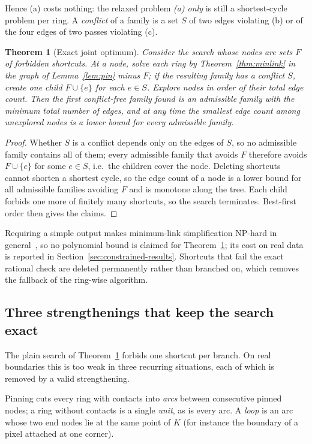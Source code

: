 \documentclass[11pt,a4paper]{article}
\newtheorem{theorem}{Theorem}
\theoremstyle{definition}
\theoremstyle{remark}
\begin{document}
Hence (a) costs nothing: the relaxed problem \emph{(a) only} is still a
shortest-cycle problem per ring. A \emph{conflict} of a family is a set $S$ of
two edges violating (b) or of the four edges of two passes violating (c).

\begin{theorem}[Exact joint optimum]\label{thm:bnb}
Consider the search whose nodes are sets $F$ of forbidden shortcuts. At a node,
solve each ring by Theorem~\ref{thm:minlink} in the graph of
Lemma~\ref{lem:pin} minus $F$; if the resulting family has a conflict $S$,
create one child $F\cup\{e\}$ for each $e\in S$. Explore nodes in order of
their total edge count. Then the first conflict-free family found is an
admissible family with the minimum total number of edges, and at any time the
smallest edge count among unexplored nodes is a lower bound for every
admissible family.
\end{theorem}
\begin{proof}
Whether $S$ is a conflict depends only on the edges of $S$, so no admissible
family contains all of them; every admissible family that avoids $F$ therefore
avoids $F\cup\{e\}$ for some $e\in S$, i.e.\ the children cover the node.
Deleting shortcuts cannot shorten a shortest cycle, so the edge count of a
node is a lower bound for all admissible families avoiding $F$ and is
monotone along the tree. Each child forbids one more of finitely many
shortcuts, so the search terminates. Best-first order then gives the claims.
\end{proof}

Requiring a simple output makes minimum-link simplification NP-hard in
general~\cite{guibas1993}, so no polynomial bound is claimed for
Theorem~\ref{thm:bnb}; its cost on real data is reported in
Section~\ref{sec:constrained-results}. Shortcuts that fail the exact rational
check are deleted permanently rather than branched on, which removes the
fallback of the ring-wise algorithm.

\subsection{Three strengthenings that keep the search exact}

The plain search of Theorem~\ref{thm:bnb} forbids one shortcut per branch.
On real boundaries this is too weak in three recurring situations, each of
which is removed by a valid strengthening.

Pinning cuts every ring with contacts into \emph{arcs} between consecutive
pinned nodes; a ring without contacts is a single \emph{unit}, as is every
arc. A \emph{loop} is an arc whose two end nodes lie at the same point of $K$
(for instance the boundary of a pixel attached at one corner).
\end{document}
